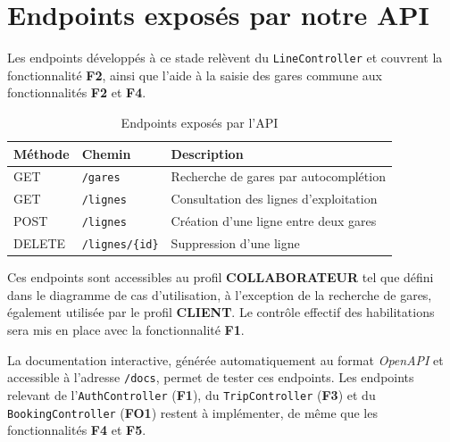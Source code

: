 \documentclass[12pt,a4paper]{report}
\begin{document}
\section{Endpoints exposés par notre API}

Les endpoints développés à ce stade relèvent du \texttt{LineController} et
couvrent la fonctionnalité \textbf{F2}, ainsi que l'aide à la saisie des gares
commune aux fonctionnalités \textbf{F2} et \textbf{F4}.

\begin{table}[htbp]
    \centering
    \begin{tabular}{lll}
        \hline
        \textbf{Méthode} & \textbf{Chemin} & \textbf{Description} \\
        \hline
        GET    & \texttt{/gares}         & Recherche de gares par autocomplétion \\
        GET    & \texttt{/lignes}        & Consultation des lignes d'exploitation \\
        POST   & \texttt{/lignes}        & Création d'une ligne entre deux gares \\
        DELETE & \texttt{/lignes/\{id\}} & Suppression d'une ligne \\
        \hline
    \end{tabular}
    \caption{Endpoints exposés par l'API}
    \label{tab:endpoints}
\end{table}

Ces endpoints sont accessibles au profil \textbf{COLLABORATEUR} tel que défini
dans le diagramme de cas d'utilisation, à l'exception de la recherche de gares,
également utilisée par le profil \textbf{CLIENT}. Le contrôle effectif des
habilitations sera mis en place avec la fonctionnalité \textbf{F1}.

La documentation interactive, générée automatiquement au format
\textit{OpenAPI} et accessible à l'adresse \texttt{/docs}, permet de tester ces
endpoints. Les endpoints relevant de l'\texttt{AuthController} (\textbf{F1}), du
\texttt{TripController} (\textbf{F3}) et du \texttt{BookingController}
(\textbf{FO1}) restent à implémenter, de même que les fonctionnalités
\textbf{F4} et \textbf{F5}.
\end{document}
